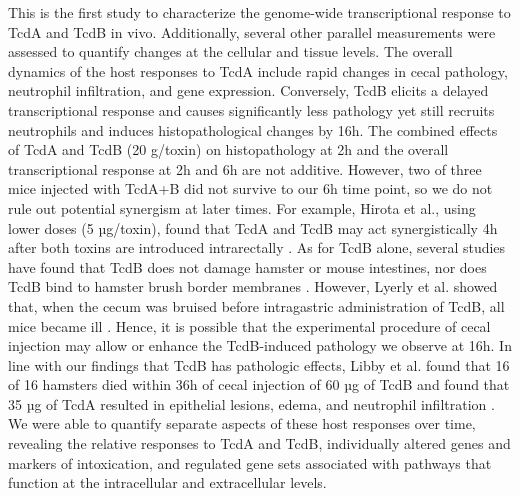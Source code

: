 This is the first study to characterize the genome-wide transcriptional response to TcdA and TcdB in vivo. Additionally, several other parallel measurements were assessed to quantify changes at the cellular and tissue levels. The overall dynamics of the host responses to TcdA include rapid changes in cecal pathology, neutrophil infiltration, and gene expression. Conversely, TcdB elicits a delayed transcriptional response and causes significantly less pathology yet still recruits neutrophils and induces histopathological changes by 16h. The combined effects of TcdA and TcdB (20 \textmu{}g/toxin) on histopathology at 2h and the overall transcriptional response at 2h and 6h are not additive. However, two of three mice injected with TcdA+B did not survive to our 6h time point, so we do not rule out potential synergism at later times. For example, Hirota et al., using lower doses (5 µg/toxin), found that TcdA and TcdB may act synergistically 4h after both toxins are introduced intrarectally \cite{Hirota:2012gx}. As for TcdB alone, several studies have found that TcdB does not damage hamster or mouse intestines, nor does TcdB bind to hamster brush border membranes \cite{Lyerly:1985dx,Rolfe:1991vx}. However, Lyerly et al. showed that, when the cecum was bruised before intragastric administration of TcdB, all mice became ill \cite{Lyerly:1985dx}. Hence, it is possible that the experimental procedure of cecal injection may allow or enhance the TcdB-induced pathology we observe at 16h. In line with our findings that TcdB has pathologic effects, Libby et al. found that 16 of 16 hamsters died within 36h of cecal injection of 60 µg of TcdB and found that 35 µg of TcdA resulted in epithelial lesions, edema, and neutrophil infiltration \cite{Libby:1982wm}. We were able to quantify separate aspects of these host responses over time, revealing the relative responses to TcdA and TcdB, individually altered genes and markers of intoxication, and regulated gene sets associated with pathways that function at the intracellular and extracellular levels.

